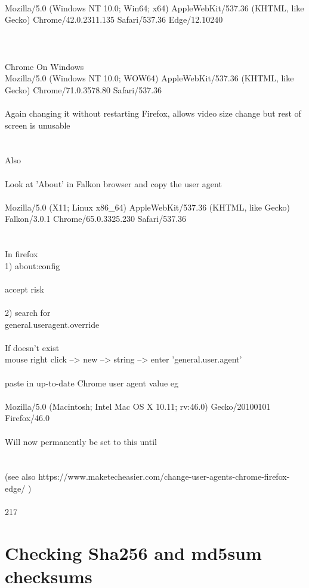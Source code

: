 \documentclass[10pt,a4paper]{article}
\begin{document}
\\
Mozilla/5.0 (Windows NT 10.0; Win64; x64) AppleWebKit/537.36 (KHTML, like Gecko) Chrome/42.0.2311.135 Safari/537.36 Edge/12.10240\\
\\
\\
\\
Chrome On Windows\\
Mozilla/5.0 (Windows NT 10.0; WOW64) AppleWebKit/537.36 (KHTML, like Gecko) Chrome/71.0.3578.80 Safari/537.36\\
\\
Again changing it without restarting Firefox, allows video size change but rest of screen is unusable\\
\\
\\
Also\\
\\
Look at 'About' in Falkon browser and copy the user agent\\
\\
Mozilla/5.0 (X11; Linux x86\_64) AppleWebKit/537.36 (KHTML, like Gecko) Falkon/3.0.1 Chrome/65.0.3325.230 Safari/537.36\\
\\
\\
In firefox\\
1) about:config\\
\\
accept risk\\
\\
2) search for \\
general.useragent.override\\
\\
If doesn't exist \\
mouse right click --> new --> string --> enter 'general.user.agent'\\
\\
paste in up-to-date Chrome user agent value eg\\
\\
Mozilla/5.0 (Macintosh; Intel Mac OS X 10.11; rv:46.0) Gecko/20100101 Firefox/46.0\\
\\
Will now permanently be set to this until \\
\\
\\
(see also https://www.maketecheasier.com/change-user-agents-chrome-firefox-edge/ )\\
\\
217
\hypertarget{checking_sha256_and_md5sum_checksums}{\section {Checking Sha256 and md5sum checksums}}
\end{document}
